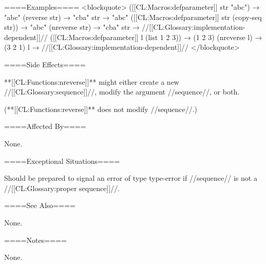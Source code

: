 ====Examples==== <blockquote> ([[CL:Macros:defparameter]] str "abc") → "abc" (reverse str) → "cba" str → "abc" ([[CL:Macros:defparameter]] str (copy-seq str)) → "abc" (nreverse str) → "cba" str → //[[CL:Glossary:implementation-dependent]]// ([[CL:Macros:defparameter]] l (list 1 2 3)) → (1 2 3) (nreverse l) → (3 2 1) l → //[[CL:Glossary:implementation-dependent]]// </blockquote>

====Side Effects====

**[[CL:Functions:nreverse]]** might either create a new //[[CL:Glossary:sequence]]//, modify the argument //sequence//, or both.

(**[[CL:Functions:reverse]]** does not modify //sequence//.)

====Affected By====

None.

====Exceptional Situations====

Should be prepared to signal an error of type type-error if //sequence// is not a //[[CL:Glossary:proper sequence]]//.

====See Also====

None.

====Notes====

None.


